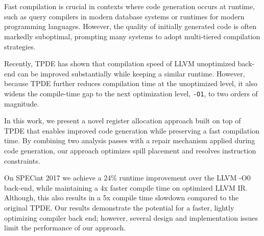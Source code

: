 \chapter{\abstractname}
Fast compilation is crucial in contexts where code generation occurs at runtime, such as query compilers in modern database systems or runtimes for modern programming languages. However, the quality of initially generated code is often markedly suboptimal, prompting many systems to adopt multi-tiered compilation strategies.

Recently, TPDE has shown that compilation speed of LLVM unoptimized back-end can be improved substantially while keeping a similar runtime. 
However, because TPDE further reduces compilation time at the unoptimized level, it also widens the compile-time gap to the next optimization level, \texttt{-O1}, to two orders of magnitude.

In this work, we present a novel register allocation approach built on top of TPDE that enables improved code generation while preserving a fast compilation time. By combining two analysis passes with a repair mechanism applied during code generation, our approach optimizes spill placement and resolves instruction constraints.

On SPECint 2017 we achieve a 24\% runtime improvement over the LLVM -O0 back-end, while maintaining a 4x faster compile time on optimized LLVM IR. Although, this also results in a 5x compile time slowdown compared to the original TPDE. Our results demonstrate the potential for a faster, lightly optimizing compiler back end; however, several design and implementation issues limit the performance of our approach.
